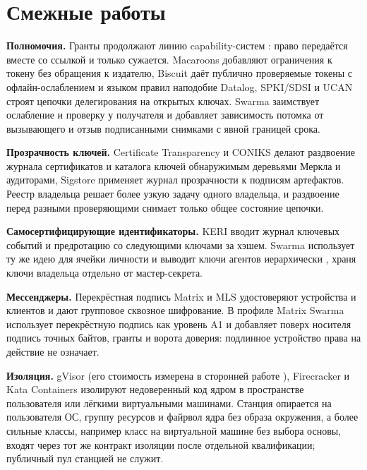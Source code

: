 \documentclass[10pt,a4paper]{article}
\begin{document}
\section{Смежные работы}
\label{sec:related}

\textbf{Полномочия.} Гранты продолжают линию capability-систем \cite{dennis1966,miller2006}: право передаётся вместе со ссылкой и только сужается. Macaroons \cite{macaroons} добавляют ограничения к токену без обращения к издателю, Biscuit \cite{biscuit} даёт публично проверяемые токены с офлайн-ослаблением и языком правил наподобие Datalog, SPKI/SDSI \cite{spki} и UCAN \cite{ucan} строят цепочки делегирования на открытых ключах. Swarma заимствует ослабление и проверку у получателя и добавляет зависимость потомка от вызывающего и отзыв подписанными снимками с явной границей срока.

\textbf{Прозрачность ключей.} Certificate Transparency \cite{ct,ct2} и CONIKS \cite{coniks} делают раздвоение журнала сертификатов и каталога ключей обнаружимым деревьями Меркла и аудиторами, Sigstore \cite{sigstore} применяет журнал прозрачности к подписям артефактов. Реестр владельца решает более узкую задачу одного владельца, и раздвоение перед разными проверяющими снимает только общее состояние цепочки.

\textbf{Самосертифицирующие идентификаторы.} KERI \cite{keri} вводит журнал ключевых событий и предротацию со следующими ключами за хэшем. Swarma использует ту же идею для ячейки личности и выводит ключи агентов иерархически \cite{bip32,slip10}, храня ключи владельца отдельно от мастер-секрета.

\textbf{Мессенджеры.} Перекрёстная подпись Matrix \cite{matrix} и MLS \cite{mls} удостоверяют устройства и клиентов и дают групповое сквозное шифрование. В профиле Matrix Swarma использует перекрёстную подпись как уровень A1 и добавляет поверх носителя подпись точных байтов, гранты и ворота доверия: подлинное устройство права на действие не означает.

\textbf{Изоляция.} gVisor (его стоимость измерена в сторонней работе \cite{gvisor}), Firecracker \cite{firecracker} и Kata Containers \cite{kata} изолируют недоверенный код ядром в пространстве пользователя или лёгкими виртуальными машинами. Станция опирается на пользователя ОС, группу ресурсов и файрвол ядра без образа окружения, а более сильные классы, например класс на виртуальной машине без выбора основы, входят через тот же контракт изоляции после отдельной квалификации; публичный пул станцией не служит.
\end{document}
